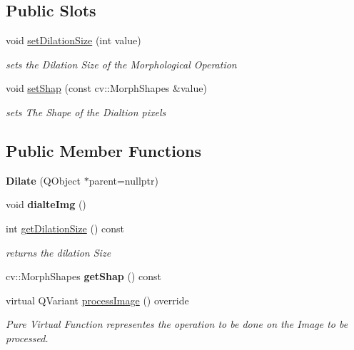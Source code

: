 \subsection*{Public Slots}
\begin{DoxyCompactItemize}
\item 
void \hyperlink{class_image_processor_1_1_dilate_addfbd49b040fc54c9a8985c764f4a144}{set\+Dilation\+Size} (int value)
\begin{DoxyCompactList}\small\item\em sets the Dilation Size of the Morphological Operation \end{DoxyCompactList}\item 
void \hyperlink{class_image_processor_1_1_dilate_a675b54d7fa85c5bce578a625a1f8ec38}{set\+Shap} (const cv\+::\+Morph\+Shapes \&value)
\begin{DoxyCompactList}\small\item\em sets The Shape of the Dialtion pixels \end{DoxyCompactList}\end{DoxyCompactItemize}
\subsection*{Public Member Functions}
\begin{DoxyCompactItemize}
\item 
\mbox{\label{class_image_processor_1_1_dilate_a062fba258056f4e1e1fed226eb05c5f8}} 
{\bfseries Dilate} (Q\+Object $\ast$parent=nullptr)
\item 
\mbox{\label{class_image_processor_1_1_dilate_aa69a7e5d14912755bd43fdf48f994899}} 
void {\bfseries dialte\+Img} ()
\item 
int \hyperlink{class_image_processor_1_1_dilate_a52a32329eb187040162c980d72544828}{get\+Dilation\+Size} () const
\begin{DoxyCompactList}\small\item\em returns the dilation Size \end{DoxyCompactList}\item 
\mbox{\label{class_image_processor_1_1_dilate_afda6caab7887fecf7e480e8a4ca51773}} 
cv\+::\+Morph\+Shapes {\bfseries get\+Shap} () const
\item 
virtual Q\+Variant \hyperlink{class_image_processor_1_1_dilate_ac4af4d83e97990416f1ccc6b80fd140b}{process\+Image} () override
\begin{DoxyCompactList}\small\item\em Pure Virtual Function representes the operation to be done on the Image to be processed. \end{DoxyCompactList}\end{DoxyCompactItemize}
